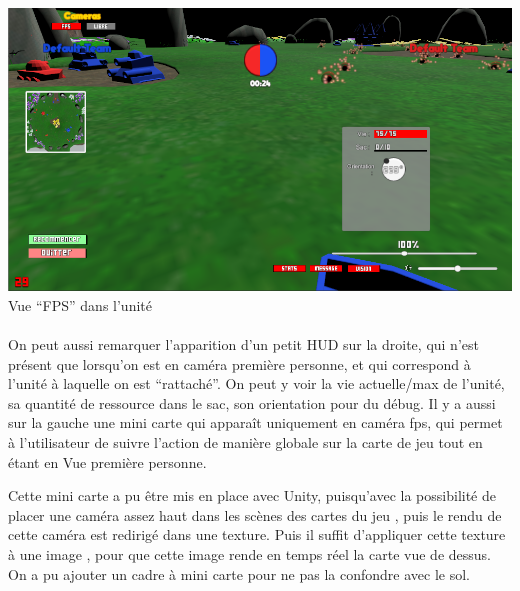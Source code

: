 \documentclass{report}
\begin{document}
\paragraph{}
\begin{center}
\includegraphics[scale=0.6]{DATA/camerafps.png}
 {Vue “FPS” dans l’unité}
\end{center}
\paragraph{}


On peut aussi remarquer l’apparition d’un petit HUD sur la droite, qui n’est présent que lorsqu’on est en caméra première personne, et qui correspond à l’unité à laquelle on est “rattaché”. On peut y voir la vie actuelle/max de l’unité, sa quantité de ressource dans le sac, son orientation pour du débug.
Il y a aussi sur la gauche une mini carte qui apparaît uniquement en caméra fps, qui permet à l’utilisateur de suivre l’action de manière globale sur la carte de jeu tout en étant en Vue première personne. 

Cette mini carte a pu être mis en place avec Unity, puisqu’avec la possibilité de placer une caméra assez haut dans les scènes des cartes du jeu , puis le rendu de cette caméra est redirigé dans une texture. Puis il suffit d’appliquer cette texture à une image , pour que cette image rende en temps réel la carte vue de dessus. 
On a pu ajouter un cadre à mini carte pour ne pas la confondre avec le sol. 
\end{document}
